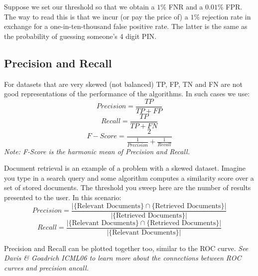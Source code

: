 \documentclass[a4paper]{article}
\begin{document}
Suppose we set our threshold so that we obtain a $1\%$ FNR and a $0.01\%$ FPR.  The way to read this is that we incur (or pay the price of) a $1\%$ rejection rate in exchange for a one-in-ten-thousand false positive rate. The latter is the same as the probability of guessing someone's 4 digit PIN.

\subsection{Precision and Recall}
For datasets that are very skewed (not balanced) TP, FP, TN and FN are not good representations of the performance of the algorithms. In such cases we use:
$$Precision = \frac{TP}{TP+FP}$$
$$Recall = \frac{TP}{TP+FN}$$
$$F-Score = \frac{2}{\frac{1}{Precision}+\frac{1}{Recall}}$$
\textit{Note: F-Score is the harmonic mean of Precision and Recall.}

Document retrieval is an example of a problem with a skewed dataset. Imagine you type in a search query and some algorithm computes a similarity score over a set of stored documents. The threshold you sweep here are the number of results presented to the user. In this scenario:
$$Precision = \frac{|\{\text{Relevant Documents}\}\cap\{\text{Retrieved Documents}\}|}{|\{\text{Retrieved Documents}\}|}$$
$$Recall = \frac{|\{\text{Relevant Documents}\}\cap\{\text{Retrieved Documents}\}|}{|\{\text{Relevant Documents}\}|}$$

Precision and Recall can be plotted together too, similar to the ROC curve.
\textit{See Davis \& Goadrich ICML06 to learn more about the connections between ROC curves and precision ancall.}
\end{document}
